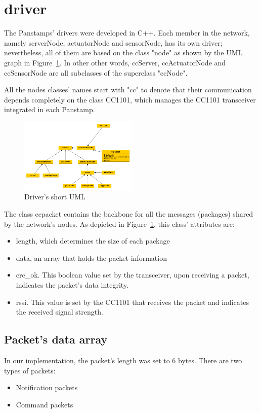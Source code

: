 \section{driver}
The Panstamps' drivers were developed in C++. Each member in the network, namely serverNode, actuatorNode and sensorNode, has its own driver; nevertheless, all of them are based on the class "node" as shown by the UML graph in Figure~\ref{fig:driverUML}. In other other words, ccServer, ccActuatorNode and ccSensorNode are all subclasses of the superclass "ccNode". 

All the nodes classes' names start with "cc" to denote that their communication depends completely on the class CC1101, which manages the CC1101 transceiver integrated in each Panstamp.

\begin{figure}[h!] 
 \centering
 \includegraphics[width= 0.5\textwidth, clip=true,keepaspectratio=true]
 {./graph/driver_short.png}
 \caption{Driver's short UML }
 \label{fig:driverUML}
\end{figure}  

The class ccpacket contains the backbone for all the messages (packages) shared by the network's nodes. As depicted in Figure~\ref{fig:driverUML}, this class' attributes are:
\begin{itemize}
\item length, which determines the size of each package
\item data, an array that holds the packet information
\item crc\_ok. This boolean value set by the transceiver, upon receiving a packet, indicates the packet's data integrity. 
\item rssi. This value is set by the CC1101 that receives the packet and indicates the received signal strength.
\end{itemize}


\subsection{Packet's data array}
In our implementation, the packet's length was set to 6 bytes. There are two types of packets:
\begin{itemize}
\item Notification packets
\item Command packets
\end{itemize}

